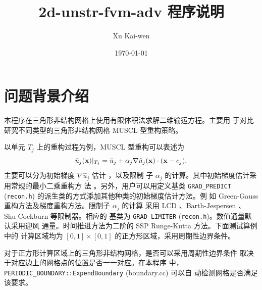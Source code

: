 


\title{2d-unstr-fvm-adv 程序说明
}
\author{ Xu Kai-wen
}

\date{\today}

\maketitle

\section{问题背景介绍}
\label{sec:intro-back}

本程序在三角形非结构网格上使用有限体积法求解二维输运方程。主要用
于对比研究不同类型的三角形非结构网格 MUSCL 型重构策略。

以单元 $T_{j}$ 上的重构过程为例，MUSCL 型重构可以表述为
\begin{equation}
  \label{eq:muscl-type-recon}
  \tilde{u}_{j}({\bf{x}})|_{T_{j}} = \bar{u}_{j} + \alpha_{j} \nabla
  \hat{u}_{j} ({\bf{x}}) \cdot ({\bf{x}} - c_{j}).
\end{equation}
主要可以分为初始梯度 $\nabla\hat{u}_{j}$ 估计 ，以及限制
子 $\alpha_{j}$ 的计算。其中初始梯度估计采用常规的最小二乘重构方
法 \cite{Park2010}。另外，用户可以用定义基类 \verb|GRAD_PREDICT|
(\verb|recon.h|) 的派生类的方式添加其他种类的初始梯度估计方法。例
如 Green-Gauss 重构方法及梯度重构方法。限制子 $\alpha_{j}$ 的计算
采用 LCD \cite{Hubbard1999}、Barth-Jespersen
\cite{Barth1989}、Shu-Cockburn\cite{Cockburn1998} 等限制器。相应的
基类为 \verb|GRAD_LIMITER| (\verb|recon.h|)。数值通量默认采用迎风
通量。时间推进方法为二阶的 SSP Runge-Kutta 方法。下面测试算例中的
计算区域均为 $[0,1]\times[0,1]$ 的正方形区域，采用周期性边界条件。

对于正方形计算区域上的三角形非结构网格，是否可以采用周期性边界条件
取决于对应边上的网格点的位置是否一一对应。在本程序
中，\verb|PERIODIC_BOUNDARY::ExpendBoundary| (boundary.cc) 可以自
动检测网格是否满足该要求。

